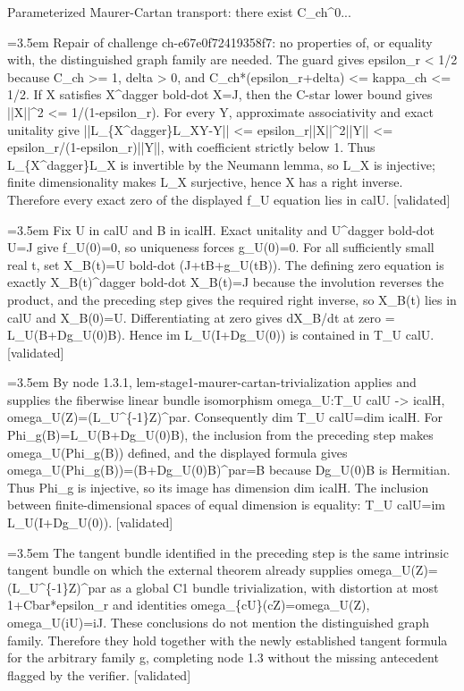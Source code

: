 \documentclass{article}
\newcommand{\step}[1]{\par\noindent\hangindent=3.5em\hangafter=1%
  \makebox[3.5em][l]{\textbf{#1.}}}
\newcommand{\steptag}[1]{\hfill{\small\textsf{[#1]}}}
\begin{document}
\begin{proofbox}{Parameterized Maurer-Cartan transport: there exist C\_ch\textasciicircum{}0...}
\step{1.3.4} Repair of challenge ch-e67e0f72419358f7: no properties of, or equality with, the distinguished graph family are needed. The guard gives epsilon\_r < 1/2 because C\_ch >= 1, delta > 0, and C\_ch*(epsilon\_r+delta) <= kappa\_ch <= 1/2. If X satisfies X\textasciicircum{}dagger bold-dot X=J, then the C-star lower bound gives ||X||\textasciicircum{}2 <= 1/(1-epsilon\_r). For every Y, approximate associativity and exact unitality give ||L\_\{X\textasciicircum{}dagger\}L\_XY-Y|| <= epsilon\_r||X||\textasciicircum{}2||Y|| <= epsilon\_r/(1-epsilon\_r)||Y||, with coefficient strictly below 1. Thus L\_\{X\textasciicircum{}dagger\}L\_X is invertible by the Neumann lemma, so L\_X is injective; finite dimensionality makes L\_X surjective, hence X has a right inverse. Therefore every exact zero of the displayed f\_U equation lies in calU. \steptag{validated} \\[4pt]
\step{1.3.5} Fix U in calU and B in icalH. Exact unitality and U\textasciicircum{}dagger bold-dot U=J give f\_U(0)=0, so uniqueness forces g\_U(0)=0. For all sufficiently small real t, set X\_B(t)=U bold-dot (J+tB+g\_U(tB)). The defining zero equation is exactly X\_B(t)\textasciicircum{}dagger bold-dot X\_B(t)=J because the involution reverses the product, and the preceding step gives the required right inverse, so X\_B(t) lies in calU and X\_B(0)=U. Differentiating at zero gives dX\_B/dt at zero = L\_U(B+Dg\_U(0)B). Hence im L\_U(I+Dg\_U(0)) is contained in T\_U calU. \steptag{validated} \\[4pt]
\step{1.3.6} By node 1.3.1, lem-stage1-maurer-cartan-trivialization applies and supplies the fiberwise linear bundle isomorphism omega\_U:T\_U calU -> icalH, omega\_U(Z)=(L\_U\textasciicircum{}\{-1\}Z)\textasciicircum{}par. Consequently dim T\_U calU=dim icalH. For Phi\_g(B)=L\_U(B+Dg\_U(0)B), the inclusion from the preceding step makes omega\_U(Phi\_g(B)) defined, and the displayed formula gives omega\_U(Phi\_g(B))=(B+Dg\_U(0)B)\textasciicircum{}par=B because Dg\_U(0)B is Hermitian. Thus Phi\_g is injective, so its image has dimension dim icalH. The inclusion between finite-dimensional spaces of equal dimension is equality: T\_U calU=im L\_U(I+Dg\_U(0)). \steptag{validated} \\[4pt]
\step{1.3.7} The tangent bundle identified in the preceding step is the same intrinsic tangent bundle on which the external theorem already supplies omega\_U(Z)=(L\_U\textasciicircum{}\{-1\}Z)\textasciicircum{}par as a global C1 bundle trivialization, with distortion at most 1+Cbar*epsilon\_r and identities omega\_\{cU\}(cZ)=omega\_U(Z), omega\_U(iU)=iJ. These conclusions do not mention the distinguished graph family. Therefore they hold together with the newly established tangent formula for the arbitrary family g, completing node 1.3 without the missing antecedent flagged by the verifier. \steptag{validated} \\[4pt]

\end{proofbox}
\end{document}
